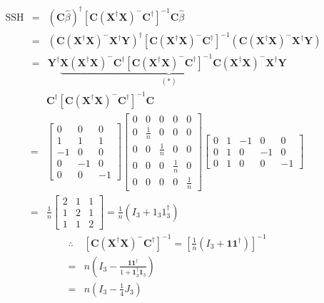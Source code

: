 \documentclass{article}
\begin{document}
\begin{eqnarray*}
\text{SSH} &=&\left( \mathbf{C}\hat{\beta}\right) ^{\dagger }\left[ \mathbf{C%
}\left( \mathbf{X}^{\dagger }\mathbf{X}\right) ^{-}\mathbf{C}^{\dagger }%
\right] ^{-1}\mathbf{C}\hat{\beta} \\
&=&\left( \mathbf{C}\left( \mathbf{X}^{\dagger }\mathbf{X}\right) ^{-}%
\mathbf{X}^{\dagger }\mathbf{Y}\right) ^{\dagger }\left[ \mathbf{C}\left( 
\mathbf{X}^{\dagger }\mathbf{X}\right) ^{-}\mathbf{C}^{\dagger }\right]
^{-1}\left( \mathbf{C}\left( \mathbf{X}^{\dagger }\mathbf{X}\right) ^{-}%
\mathbf{X}^{\dagger }\mathbf{Y}\right) \\
&=&\mathbf{Y}^{\dagger }\underset{\left( \ast \right) }{\underbrace{\mathbf{X%
}\left( \mathbf{X}^{\dagger }\mathbf{X}\right) ^{-}\mathbf{C}^{\dagger }%
\left[ \mathbf{C}\left( \mathbf{X}^{\dagger }\mathbf{X}\right) ^{-}\mathbf{C}%
^{\dagger }\right] ^{-1}\mathbf{C}\left( \mathbf{X}^{\dagger }\mathbf{X}%
\right) ^{-}\mathbf{X}^{\dagger }}}\mathbf{Y}
\end{eqnarray*}%
\begin{eqnarray*}
&&\mathbf{C}^{\dagger }\left[ \mathbf{C}\left( \mathbf{X}^{\dagger }\mathbf{X%
}\right) ^{-}\mathbf{C}^{\dagger }\right] ^{-1}\mathbf{C} \\
&=&\left[ 
\begin{array}{ccc}
0 & 0 & 0 \\ 
1 & 1 & 1 \\ 
-1 & 0 & 0 \\ 
0 & -1 & 0 \\ 
0 & 0 & -1%
\end{array}%
\right] \left[ 
\begin{array}{ccccc}
0 & 0 & 0 & 0 & 0 \\ 
0 & \frac{1}{n} & 0 & 0 & 0 \\ 
0 & 0 & \frac{1}{n} & 0 & 0 \\ 
0 & 0 & 0 & \frac{1}{n} & 0 \\ 
0 & 0 & 0 & 0 & \frac{1}{n}%
\end{array}%
\right] \left[ 
\begin{array}{ccccc}
0 & 1 & -1 & 0 & 0 \\ 
0 & 1 & 0 & -1 & 0 \\ 
0 & 1 & 0 & 0 & -1%
\end{array}%
\right] \\
&=&\frac{1}{n}\left[ 
\begin{array}{ccc}
2 & 1 & 1 \\ 
1 & 2 & 1 \\ 
1 & 1 & 2%
\end{array}%
\right] =\frac{1}{n}\left( I_{3}+1_{3}1_{3}^{\dagger }\right)
\end{eqnarray*}%
\begin{eqnarray*}
&\therefore &\left[ \mathbf{C}\left( \mathbf{X}^{\dagger }\mathbf{X}\right)
^{-}\mathbf{C}^{\dagger }\right] ^{-1}=\left[ \frac{1}{n}\left( I_{3}+%
\boldsymbol{11}^{\dagger }\right) \right] ^{-1} \\
&=&n\left( I_{3}-\frac{\mathbf{11}^{\dagger }}{1+\mathbf{1}_{3}^{\dagger }%
\mathbf{1}_{3}}\right) \\
&=&n\left( I_{3}-\frac{1}{4}J_{3}\right)
\end{eqnarray*}
\end{document}
